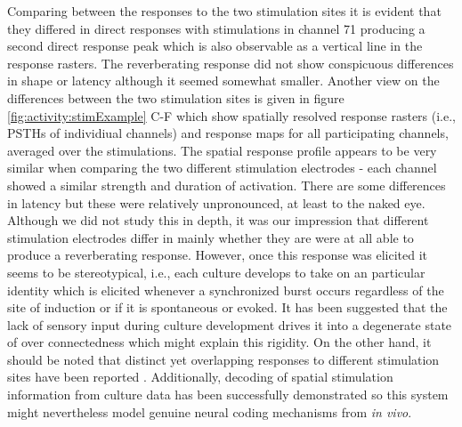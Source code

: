     Comparing between the responses to the two stimulation sites it is evident that they differed in direct responses with stimulations in channel 71 producing a second direct response peak which is also observable as a vertical line in the response rasters. The reverberating response did not show conspicuous differences in shape or latency although it seemed somewhat smaller. Another view on the differences between the two stimulation sites is given in figure \ref{fig:activity:stimExample} C-F which show spatially resolved response rasters (i.e., PSTHs of individiual channels) and response maps for all participating channels, averaged over the stimulations. The spatial response profile appears to be very similar when comparing the two different stimulation electrodes - each channel showed a similar strength and duration of activation. There are some differences in latency but these were relatively unpronounced, at least to the naked eye. Although we did not study this in depth, it was our impression that different stimulation electrodes differ in mainly whether they are were at all able to produce a reverberating response. However, once this response was elicited it seems to be stereotypical, i.e., each culture develops to take on an particular identity which is elicited whenever a synchronized burst occurs regardless of the site of induction or if it is spontaneous or evoked. It has been suggested that the lack of sensory input during culture development drives it into a degenerate state of over connectedness which might explain this rigidity. On the other hand, it should be noted that distinct yet overlapping responses to different stimulation sites have been reported \cite{wagenaar2006searching}. Additionally, decoding of spatial stimulation information from culture data has been successfully demonstrated \cite{kermany2010tradeoffs} so this system might nevertheless model genuine neural coding mechanisms from \textit{in vivo}.

